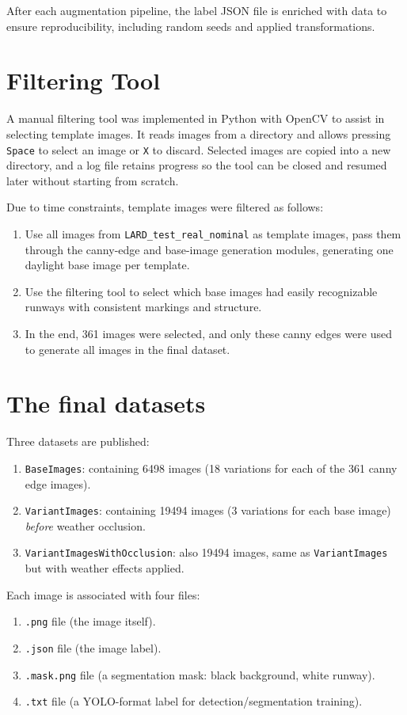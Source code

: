 After each augmentation pipeline, the label JSON file is enriched with data to ensure reproducibility, including random seeds and applied transformations.

\section{Filtering Tool}

A manual filtering tool was implemented in Python with OpenCV to assist in selecting template images. 
It reads images from a directory and allows pressing \texttt{Space} to select an image or \texttt{X} to discard. 
Selected images are copied into a new directory, and a log file retains progress so the tool can be closed and resumed later without starting from scratch.

Due to time constraints, template images were filtered as follows:
\begin{enumerate}
\item Use all images from \texttt{LARD\_test\_real\_nominal} as template images, pass them through the canny-edge and base-image generation modules, generating one daylight base image per template.
\item Use the filtering tool to select which base images had easily recognizable runways with consistent markings and structure.
\item In the end, 361 images were selected, and only these canny edges were used to generate all images in the final dataset.
\end{enumerate}

\section{The final datasets}

Three datasets are published:

\begin{enumerate}
\item \texttt{BaseImages}: containing 6498 images (18 variations for each of the 361 canny edge images).
\item \texttt{VariantImages}: containing 19494 images (3 variations for each base image) \emph{before} weather occlusion.
\item \texttt{VariantImagesWithOcclusion}: also 19494 images, same as \texttt{VariantImages} but with weather effects applied.
\end{enumerate}

Each image is associated with four files:
\begin{enumerate}
\item \texttt{.png} file (the image itself).
\item \texttt{.json} file (the image label).
\item \texttt{.mask.png} file (a segmentation mask: black background, white runway).
\item \texttt{.txt} file (a YOLO-format label for detection/segmentation training).
\end{enumerate}

